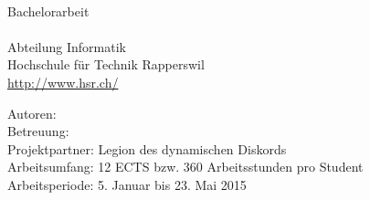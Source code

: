 \begin{titlepage}
\begin{flushleft}
{\huge \bfseries \TITLE}\\[2.5cm]

Bachelorarbeit \\
\SEMESTER \\
Abteilung Informatik \\
Hochschule für Technik Rapperswil \\
\url{http://www.hsr.ch/}\\[2cm]

\vfill

Autoren: \AUTHOR \\
Betreuung: \SUPERVISOR \\
Projektpartner: Legion des dynamischen Diskords \\
Arbeitsumfang: 12 ECTS bzw. 360 Arbeitsstunden pro Student \\
Arbeitsperiode: 5. Januar bis 23. Mai 2015 \\

\end{flushleft}
\end{titlepage}
